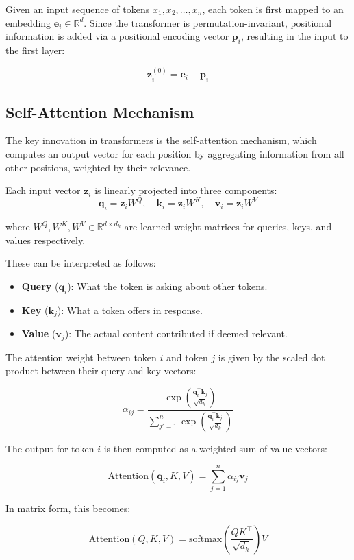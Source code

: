 \documentclass{article}
\begin{document}
Given an input sequence of tokens $x_1, x_2, \dots, x_n$, each token is first mapped to an embedding $\mathbf{e}_i \in \mathbb{R}^d$. Since the transformer is permutation-invariant, positional information is added via a positional encoding vector $\mathbf{p}_i$, resulting in the input to the first layer:

\[
\mathbf{z}_i^{(0)} = \mathbf{e}_i + \mathbf{p}_i
\]

\subsection{Self-Attention Mechanism}

The key innovation in transformers is the self-attention mechanism, which computes an output vector for each position by aggregating information from all other positions, weighted by their relevance.

Each input vector $\mathbf{z}_i$ is linearly projected into three components:
\[
\mathbf{q}_i = \mathbf{z}_i W^Q, \quad \mathbf{k}_i = \mathbf{z}_i W^K, \quad \mathbf{v}_i = \mathbf{z}_i W^V
\]

where $W^Q, W^K, W^V \in \mathbb{R}^{d \times d_k}$ are learned weight matrices for queries, keys, and values respectively.

These can be interpreted as follows:
\begin{itemize}
  \item \textbf{Query} ($\mathbf{q}_i$): What the token is asking about other tokens.
  \item \textbf{Key} ($\mathbf{k}_j$): What a token offers in response.
  \item \textbf{Value} ($\mathbf{v}_j$): The actual content contributed if deemed relevant.
\end{itemize}

The attention weight between token $i$ and token $j$ is given by the scaled dot product between their query and key vectors:

\[
\alpha_{ij} = \frac{\exp\left(\frac{\mathbf{q}_i^\top \mathbf{k}_j}{\sqrt{d_k}}\right)}{\sum_{j'=1}^{n} \exp\left(\frac{\mathbf{q}_i^\top \mathbf{k}_{j'}}{\sqrt{d_k}}\right)}
\]

The output for token $i$ is then computed as a weighted sum of value vectors:

\[
\text{Attention}(\mathbf{q}_i, K, V) = \sum_{j=1}^{n} \alpha_{ij} \mathbf{v}_j
\]

In matrix form, this becomes:

\[
\text{Attention}(Q, K, V) = \text{softmax}\left(\frac{QK^\top}{\sqrt{d_k}}\right)V
\]
\end{document}
